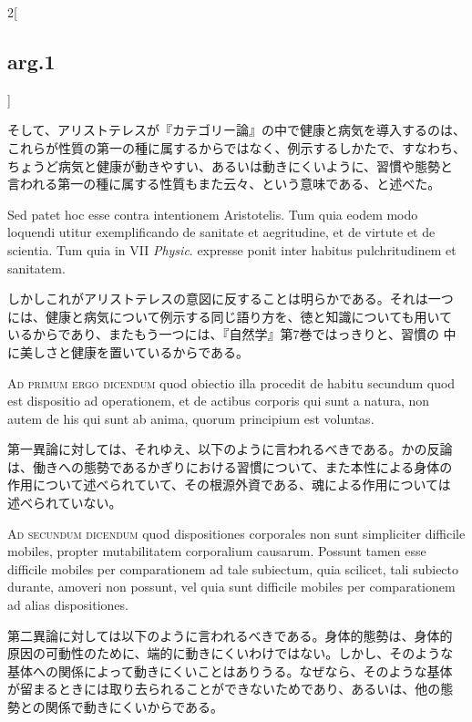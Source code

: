 \documentclass[paper=a4paper,fontsize=10pt,jafontsize=9pt,titlepage]{jlreq}
\begin{document}
\begin{paracol}{2}[\subsection{arg.1}]
\switchcolumn

そして、アリストテレスが『カテゴリー論』の中で健康と病気を導入するのは、
これらが性質の第一の種に属するからではなく、例示するしかたで、すなわち、
ちょうど病気と健康が動きやすい、あるいは動きにくいように、習慣や態勢と
言われる第一の種に属する性質もまた云々、という意味である、と述べた。

\switchcolumn*

Sed patet hoc esse contra intentionem Aristotelis. Tum quia eodem modo
loquendi utitur exemplificando de sanitate et aegritudine, et de
virtute et de scientia. Tum quia in VII {\itshape Physic}. expresse ponit inter
habitus pulchritudinem et sanitatem.

\switchcolumn

しかしこれがアリストテレスの意図に反することは明らかである。それは一つ
には、健康と病気について例示する同じ語り方を、徳と知識についても用いて
いるからであり、またもう一つには、『自然学』第7巻ではっきりと、習慣の
中に美しさと健康を置いているからである。

\switchcolumn*[\subsection{ad.1}]

{\scshape Ad primum ergo dicendum} quod obiectio illa procedit de habitu secundum
quod est dispositio ad operationem, et de actibus corporis qui sunt a
natura, non autem de his qui sunt ab anima, quorum principium est
voluntas.

\switchcolumn

第一異論に対しては、それゆえ、以下のように言われるべきである。かの反論
は、働きへの態勢であるかぎりにおける習慣について、また本性による身体の
作用について述べられていて、その根源外資である、魂による作用については
述べられていない。

\switchcolumn*[\subsection{ad.2}]

{\scshape Ad secundum dicendum} quod dispositiones corporales non sunt
simpliciter difficile mobiles, propter mutabilitatem corporalium
causarum. Possunt tamen esse difficile mobiles per comparationem ad
tale subiectum, quia scilicet, tali subiecto durante, amoveri non
possunt, vel quia sunt difficile mobiles per comparationem ad alias
dispositiones.

\switchcolumn

第二異論に対しては以下のように言われるべきである。身体的態勢は、身体的
原因の可動性のために、端的に動きにくいわけではない。しかし、そのような
基体への関係によって動きにくいことはありうる。なぜなら、そのような基体
が留まるときには取り去られることができないためであり、あるいは、他の態
勢との関係で動きにくいからである。


\end{paracol}
\end{document}
